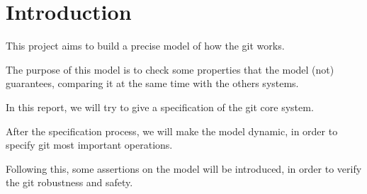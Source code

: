 \section{Introduction}

This project aims to build a precise model of how the git works. \par
The purpose of this model is to check some properties that the model
(not) guarantees, comparing it at the same time with the others
systems. \par
In this report, we will try to give a specification
of the git core system. \par
After the specification process, we will make the
model dynamic, in order to specify git most important operations. \par
Following this, some assertions on the model will be
introduced, in order
to verify the git robustness and safety. \par
